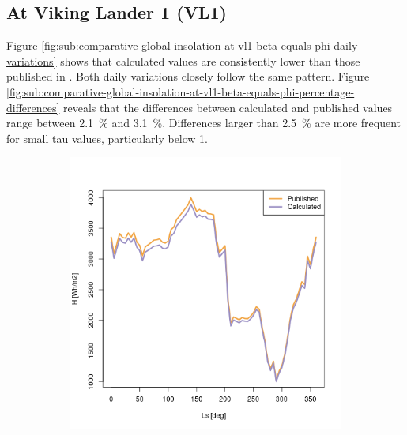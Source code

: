 \subsection{At Viking Lander 1 (VL1)}
Figure \ref{fig:sub:comparative-global-insolation-at-vl1-beta-equals-phi-daily-variations} shows that calculated values are consistently lower than those published in . Both daily variations closely follow the same pattern. Figure \ref{fig:sub:comparative-global-insolation-at-vl1-beta-equals-phi-percentage-differences} reveals that the differences between calculated and published values range between \SI{2.1}{\percent} and \SI{3.1}{\percent}. Differences larger than \SI{2.5}{\percent} are more frequent for small tau values, particularly below 1.

\begin{figure}[H]
\captionsetup[subfigure]{justification=centering}
\vspace{-2ex}
\centering
    \setlength{\subfigureWidth}{0.50\textwidth}
    \setlength{\graphicsHeight}{80mm}
    \hypersetup{hidelinks=true}%
    \begin{subfigure}[t]{\subfigureWidth}
        \centering
            \includegraphics[height=\graphicsHeight]{sections/appendix/A/plots/h-exp-calc-at-vl1-with-beta-223-deg.png}

\end{subfigure}
\end{figure}
